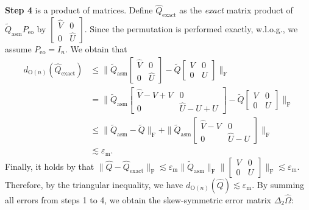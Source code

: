 \documentclass[10pt,twoside,dvipsnames]{siamart1116}
\numberwithin{algorithm}{section}
\numberwithin{equation}{section}
\begin{document}
	
	
	\textbf{Step 4} is a product of matrices. Define $\widehat{Q}_{\mathrm{exact}}$ as the \emph{exact} matrix product of $\widetilde{Q}_{\mathrm{asm}}P_{\mathrm{eo}}$ by $\left[\begin{smallmatrix}
		\widehat{V}&0\\
		0&\widehat{U}
		\end{smallmatrix}\right]$. Since the permutation is performed exactly, w.l.o.g., we assume $P_{\mathrm{eo}}=I_n$. We obtain that 
		\begin{align*}
		d_{\mathrm{O}(n)}(\widehat{Q}_{\mathrm{exact}})&\leq \|\widetilde{Q}_{\mathrm{asm}}\left[\begin{smallmatrix}
		\widehat{V}&0\\
		0&\widehat{U}
		\end{smallmatrix}\right] - \widetilde{Q}\left[\begin{smallmatrix}
		V&0\\
		0&U
		\end{smallmatrix}\right]\|_\mathrm{F}\\
		&= \|\widetilde{Q}_{\mathrm{asm}}\left[\begin{smallmatrix}
		\widehat{V}-V+V&0\\
		0&\widehat{U}-U+U
		\end{smallmatrix}\right] - \widetilde{Q}\left[\begin{smallmatrix}
		V&0\\
		0&U
		\end{smallmatrix}\right]\|_\mathrm{F}\\
		&\leq  \|\widetilde{Q}_{\mathrm{asm}} - \widetilde{Q}\|_\mathrm{F} + \|\widetilde{Q}_{\mathrm{asm}} \left[\begin{smallmatrix}
		\widehat{V}-V&0\\
		0&\widehat{U}-U
		\end{smallmatrix}\right]\|_\mathrm{F}\\
		&\lesssim \varepsilon_\mathrm{m}.
		\end{align*}
	Finally, it holds by \cite[Eq.~3.13]{Higham2002} that $\|\widehat{Q} - \widehat{Q}_{\mathrm{exact}}\|_\mathrm{F}\lesssim \varepsilon_\mathrm{m} \|\widetilde{Q}_{\mathrm{asm}}\|_\mathrm{F}\|\left[\begin{smallmatrix}
		V&0\\
		0&U
		\end{smallmatrix}\right]\|_\mathrm{F}\lesssim \varepsilon_\mathrm{m}$. Therefore, by the triangular inequality, we have $d_{\mathrm{O}(n)}(\widehat{Q}) \lesssim \varepsilon_\mathrm{m}$. By summing all errors from steps 1 to 4, we obtain the skew-symmetric error matrix $\Delta_2\widehat{\Omega}$:
\end{document}
